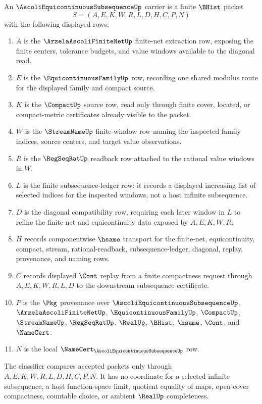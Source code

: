 \begin{definition}
\label{def:ascoli-equicontinuous-subsequence-carrier}
An $\AscoliEquicontinuousSubsequenceUp$ carrier is a finite $\BHist$ packet
$$
S=(A,E,K,W,R,L,D,H,C,P,N)
$$
with the following displayed rows:
\begin{enumerate}
\item $A$ is the $\ArzelaAscoliFiniteNetUp$ finite-net extraction row, exposing the finite centers, tolerance budgets, and value windows available to the diagonal read.
\item $E$ is the $\EquicontinuousFamilyUp$ row, recording one shared modulus route for the displayed family and compact source.
\item $K$ is the $\CompactUp$ source row, read only through finite cover, located, or compact-metric certificates already visible to the packet.
\item $W$ is the $\StreamNameUp$ finite-window row naming the inspected family indices, source centers, and target value observations.
\item $R$ is the $\RegSeqRatUp$ readback row attached to the rational value windows in $W$.
\item $L$ is the finite subsequence-ledger row: it records a displayed increasing list of selected indices for the inspected windows, not a host infinite subsequence.
\item $D$ is the diagonal compatibility row, requiring each later window in $L$ to refine the finite-net and equicontinuity data exposed by $A,E,K,W,R$.
\item $H$ records componentwise $\hsame$ transport for the finite-net, equicontinuity, compact, stream, rational-readback, subsequence-ledger, diagonal, replay, provenance, and naming rows.
\item $C$ records displayed $\Cont$ replay from a finite compactness request through $A,E,K,W,R,L,D$ to the downstream subsequence certificate.
\item $P$ is the $\Pkg$ provenance over $\AscoliEquicontinuousSubsequenceUp$, $\ArzelaAscoliFiniteNetUp$, $\EquicontinuousFamilyUp$, $\CompactUp$, $\StreamNameUp$, $\RegSeqRatUp$, $\RealUp$, $\BHist$, $\hsame$, $\Cont$, and $\NameCert$.
\item $N$ is the local $\NameCert_{\AscoliEquicontinuousSubsequenceUp}$ row.
\end{enumerate}
The classifier compares accepted packets only through $A,E,K,W,R,L,D,H,C,P,N$. It has no coordinate for a selected infinite subsequence, a host function-space limit, quotient equality of maps, open-cover compactness, countable choice, or ambient $\RealUp$ completeness.
\end{definition}


